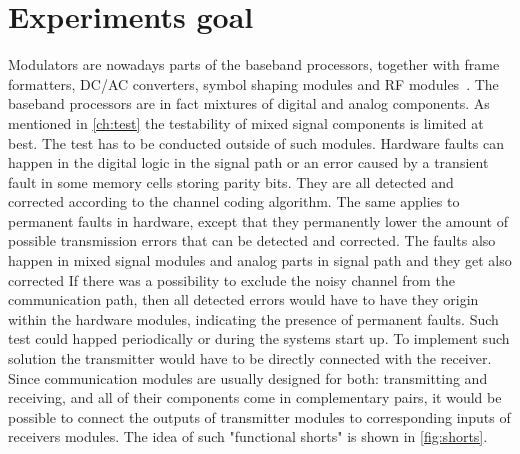 \section{Experiments goal}
Modulators are nowadays parts of the baseband processors, together with frame formatters, DC/AC converters, symbol shaping modules and RF modules~\cite{book:Ismail}. The baseband processors are in fact mixtures of digital and analog components. As mentioned in \autoref{ch:test} the testability of mixed signal components is limited at best. The test has to be conducted outside of such modules.
Hardware faults can happen in the digital logic in the signal path or an error caused by a transient fault in some memory cells storing parity bits. They are all detected and corrected according to the channel coding algorithm. The same applies to permanent faults in hardware, except that they permanently lower the amount of possible transmission errors that can be detected and corrected. The faults also happen in mixed signal modules and analog parts in signal path and they get also corrected 
If there was a possibility to exclude the noisy channel from the communication path, then all detected errors would have to have they origin within the hardware modules, indicating the presence of permanent faults. Such test could happed periodically or during the systems start up.
To implement such solution the transmitter would have to be directly connected with the receiver. Since communication modules are usually designed for both: transmitting and receiving, and all of their components come in complementary pairs, it would be possible to connect the outputs of transmitter modules to corresponding inputs of receivers modules. The idea of such "functional shorts" is shown in \autoref{fig:shorts}.
